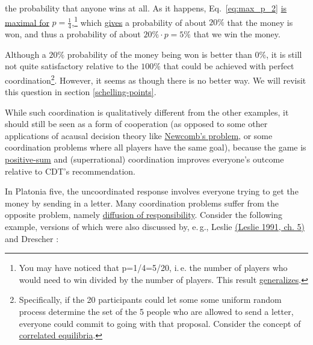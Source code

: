 the probability that anyone wins at all. As it happens, Eq.~\eqref{eq:max_p_2}
\href{http://www.wolframalpha.com/input/?i=maximize+p\%5E5+*+(1-p)\%5E15}{is
maximal for} \(p = \frac{1}{4}\),\footnote{You may have noticed that
  p=1/4=5/20, i.\,e. the number of players who would need to win divided
  by the number of players. This result
  \href{http://www.wolframalpha.com/input/?i=d\%2Fdp+p\%5En+(1-p)\%5Em}{generalizes}.}
which
\href{http://www.wolframalpha.com/input/?i=(20+choose+5)+*+(1\%2F4)\%5E5+*+(3\%2F4)\%5E15}{gives}
a probability of about \(20\%\) that the money is won, and thus a
probability of about \(20\% \cdot p = 5\%\) that we win the money.

Although a \(20\%\) probability of the money being won is better than
\(0\%\), it is still not quite satisfactory relative to the \(100\%\)
that could be achieved with perfect coordination\footnote{Specifically,
  if the 20 participants could let some some uniform random process
  determine the set of the 5 people who are allowed to send a letter,
  everyone could commit to going with that proposal. Consider the
  concept of
  \href{https://en.wikipedia.org/wiki/Correlated_equilibrium}{correlated
  equilibria}.}. However, it seems as though there is no better way. We
will revisit this question in section
\ref{schelling-points}.

While such coordination is qualitatively different from the other
examples, it should still be seen as a form of cooperation (as opposed
to some other applications of acausal decision theory like
\href{http://lesswrong.com/lw/nc/newcombs_problem_and_regret_of_rationality/}{Newcomb's
problem}, or some coordination problems where all players have the same
goal), because the game is
\href{https://www.edge.org/response-detail/10135}{positive-sum}
and (superrational) coordination improves everyone's outcome relative to
CDT's recommendation.

In Platonia five, the uncoordinated response involves everyone trying to
get the money by sending in a letter. Many coordination problems suffer
from the opposite problem, namely
\href{https://en.wikipedia.org/wiki/Diffusion_of_responsibility}{diffusion
of responsibility}. Consider the following example, versions of which
were also discussed by, e.\,g., Leslie
\href{https://sl4librarian.files.wordpress.com/2016/12/two-bird-deaths-one-throw-leslie.pdf}{(Leslie
1991, ch. 5)} and Drescher \citeyear{Drescher2006-ky}:

